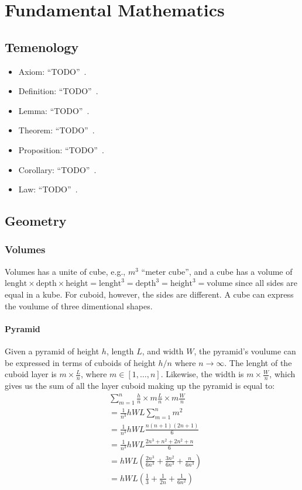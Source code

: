 \chapter{Fundamental Mathematics}

\section{Temenology}
\begin{itemize}
\item Axiom: ``TODO''~\cite{oed}.
\item Definition: ``TODO''~\cite{oed}.
\item Lemma: ``TODO''~\cite{oed}.
\item Theorem: ``TODO''~\cite{oed}.
\item Proposition: ``TODO''~\cite{oed}.
\item Corollary: ``TODO''~\cite{oed}.
\item Law: ``TODO''~\cite{oed}.
\end{itemize}


\section{Geometry}
\subsection{Volumes}
Volumes has a unite of cube, e.g., $m^3$ ``meter cube'', and a cube has a volume of $\text{lenght}\times\text{depth}\times\text{height} = \text{lenght}^3 = \text{depth}^3 = \text{height}^3 = \text{volume}$ since all sides are equal in a kube. For cuboid, however, the sides are different. A cube can express the voulume of three dimentional shapes.

\subsubsection{Pyramid}
Given a pyramid of height $h$, length $L$, and width $W$, the pyramid's voulume can be expressed in terms of cuboids of height $h/n$ where $n\to\infty$. The lenght of the cuboid layer is $m\times\frac{L}{n}$, where $m\in[1,\ldots,n]$. Likewise, the width is $m\times\frac{W}{n}$, which gives us the sum of all the layer cuboid making up the pyramid is equal to:
\begin{align*}
  &\sum_{m=1}^n\frac{h}{n}\times m\frac{L}{n}\times m\frac{W}{n} \\
  &=\frac{1}{n^3}hWL\sum_{m=1}^n m^2 \\
  &=\frac{1}{n^3}hWL\frac{n(n+1)(2n+1)}{6} \\
  &=\frac{1}{n^3}hWL\frac{2n^3+n^2+2n^2+n}{6} \\
  &=hWL\left(\frac{2n^3}{6n^3}+\frac{3n^2}{6n^3}+\frac{n}{6n^3}\right) \\
  &=hWL\left(\frac{1}{3}+\frac{1}{2n}+\frac{1}{6n^2}\right) \\
\end{align*}

